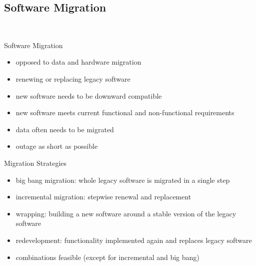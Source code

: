 \subsection{Software Migration}
\begin{frame}{\insertsubsection\ \mytitlesource{\ludewiglichter}}
	\begin{fancycolumns}
		\begin{definition}{Software Migration}
			\begin{itemize}
				\item opposed to data and hardware migration
				\item renewing or replacing legacy software
				\item new software needs to be downward compatible
				\item new software meets current functional and non-functional requirements
				\item data often needs to be migrated
				\item outage as short as possible
			\end{itemize}
		\end{definition}
		\nextcolumn
		\begin{note}{Migration Strategies}
			\begin{itemize}
				\item big bang migration: whole legacy software is migrated in a single step
				\item incremental migration: stepwise renewal and replacement
				\item wrapping: building a new software around a stable version of the legacy software
				\item redevelopment: functionality implemented again and replaces legacy software
				\item combinations feasible (except for incremental and big bang)
			\end{itemize}
		\end{note}
	\end{fancycolumns}
\end{frame}


%
%
%

